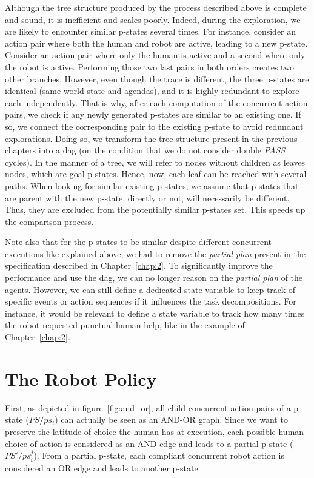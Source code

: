 Although the tree structure produced by the process described above is complete and sound, it is inefficient and scales poorly. Indeed, during the exploration, we are likely to encounter similar p-states several times. For instance, consider an action pair where both the human and robot are active, leading to a new p-state. Consider an action pair where only the human is active and a second where only the robot is active. Performing those two last pairs in both orders creates two other branches. However, even though the trace is different, the three p-states are identical (same world state and agendas), and it is highly redundant to explore each independently. That is why, after each computation of the concurrent action pairs, we check if any newly generated p-states are similar to an existing one. If so, we connect the corresponding pair to the existing p-state to avoid redundant explorations. Doing so, we transform the tree structure present in the previous chapters into a \acrfull{dag} (on the condition that we do not consider double \textit{PASS} cycles). In the manner of a tree, we will refer to nodes without children as leaves nodes, which are goal p-states. Hence, now, each leaf can be reached with several paths. 
When looking for similar existing p-states, we assume that p-states that are parent with the new p-state, directly or not, will necessarily be different. Thus, they are excluded from the potentially similar p-states set. This speeds up the comparison process. 

Note also that for the p-states to be similar despite different concurrent executions like explained above, we had to remove the \textit{partial plan} present in the specification described in Chapter~\ref{chap:2}. To significantly improve the performance and use the \acrshort{dag}, we can no longer reason on the \textit{partial plan} of the agents. However, we can still define a dedicated state variable to keep track of specific events or action sequences if it influences the task decompositions. For instance, it would be relevant to define a state variable to track how many times the robot requested punctual human help, like in the example of Chapter~\ref{chap:2}.    

\section{The Robot Policy}

First, as depicted in figure~\ref{fig:and_or}, all child concurrent action pairs of a p-state ($PS / ps_i$) can actually be seen as an AND-OR graph. Since we want to preserve the latitude of choice the human has at execution, each possible human choice of action is considered as an AND edge and leads to a partial p-state ($PS' / ps_i^j$). From a partial p-state, each compliant concurrent robot action is considered an OR edge and leads to another p-state.

